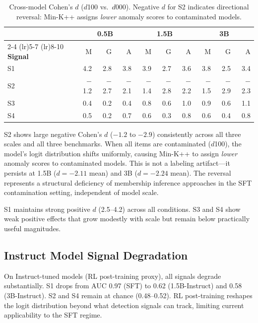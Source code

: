 \documentclass[11pt,a4paper]{article}
\begin{document}
\begin{table}[t]
\centering
\small
\caption{Cross-model Cohen's $d$ ($d$100 vs.\ $d$000). Negative $d$ for S2 indicates directional reversal: Min-K++ assigns \emph{lower} anomaly scores to contaminated models.}
\label{tab:cohens_d}
\begin{tabular}{@{}l rrr rrr rrr@{}}
\toprule
& \multicolumn{3}{c}{\textbf{0.5B}} & \multicolumn{3}{c}{\textbf{1.5B}} & \multicolumn{3}{c}{\textbf{3B}} \\
\cmidrule(lr){2-4} \cmidrule(lr){5-7} \cmidrule(lr){8-10}
\textbf{Signal} & M & G & A & M & G & A & M & G & A \\
\midrule
S1 & 4.2 & 2.8 & 3.8 & 3.9 & 2.7 & 3.6 & 3.8 & 2.5 & 3.4 \\
S2 & $-$1.2 & $-$2.7 & $-$2.1 & $-$1.4 & $-$2.8 & $-$2.2 & $-$1.5 & $-$2.9 & $-$2.3 \\
S3 & 0.4 & 0.2 & 0.4 & 0.8 & 0.6 & 1.0 & 0.9 & 0.6 & 1.1 \\
S4 & 0.5 & 0.2 & 0.7 & 0.6 & 0.3 & 0.8 & 0.6 & 0.4 & 0.8 \\
\bottomrule
\end{tabular}
\vspace{-2mm}
\end{table}

S2 shows large negative Cohen's $d$ ($-1.2$ to $-2.9$) consistently across all three scales and all three benchmarks.
When all items are contaminated ($d$100), the model's logit distribution shifts uniformly, causing Min-K++ to assign \emph{lower} anomaly scores to contaminated models.
This is not a labeling artifact---it persists at 1.5B ($d = -2.11$ mean) and 3B ($d = -2.24$ mean).
The reversal represents a structural deficiency of membership inference approaches in the SFT contamination setting, independent of model scale.

S1 maintains strong positive $d$ (2.5--4.2) across all conditions.
S3 and S4 show weak positive effects that grow modestly with scale but remain below practically useful magnitudes.

\subsection{Instruct Model Signal Degradation}

On Instruct-tuned models (RL post-training proxy), all signals degrade substantially.
S1 drops from AUC 0.97 (SFT) to 0.62 (1.5B-Instruct) and 0.58 (3B-Instruct).
S2 and S4 remain at chance (0.48--0.52).
RL post-training reshapes the logit distribution beyond what detection signals can track, limiting current applicability to the SFT regime.
\end{document}
